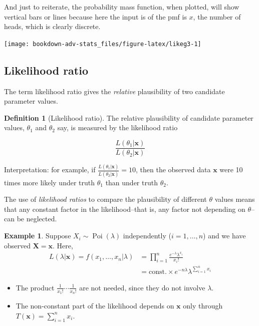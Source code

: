 \documentclass[
]{book}
\providecommand{\tightlist}{%
  \setlength{\itemsep}{0pt}\setlength{\parskip}{0pt}}
\newcommand{\bx}{{\boldsymbol x}}
\newcommand{\bX}{{\boldsymbol X}}
\DeclareMathOperator{\Pois}{Poi}
\newcommand{\const}{\text{const.}}
\theoremstyle{definition}
\newtheorem{definition}{Definition}[chapter]
\theoremstyle{definition}
\newtheorem{example}{Example}[chapter]
\theoremstyle{definition}
\theoremstyle{definition}
\theoremstyle{remark}
\begin{document}
And just to reiterate, the probability mass function, when plotted, will show vertical bars or lines because here the input is of the pmf is \(x\), the number of heads, which is clearly discrete.

\begin{center}\texttt{[image: bookdown-adv-stats\_files/figure-latex/likeg3-1]} \end{center}

\hypertarget{likelihood-ratio}{%
\subsection{Likelihood ratio}\label{likelihood-ratio}}

The term likelihood ratio gives the \emph{relative} plausibility of two candidate parameter values.

\begin{definition}[Likelihood ratio]
The relative plausibility of candidate parameter values, \(\theta_1\) and \(\theta_2\) say, is measured by the likelihood ratio

\[
\frac{L(\theta_1|\bx)}{L(\theta_2|\bx)}
\]
\end{definition}

Interpretation: for example, if \(\frac{L(\theta_1|\bx)}{L(\theta_2|\bx)} = 10\), then the observed data \(\bx\) were 10 times more likely under truth \(\theta_1\) than under truth \(\theta_2\).

The use of \emph{likelihood ratios} to compare the plausibility of different \(\theta\) values means that any constant factor in the likelihood--that is, any factor not depending on \(\theta\)--can be neglected.

\begin{example}

Suppose \(X_i\sim\Pois(\lambda)\) independently (\(i=1,\dots,n\)) and we have observed \(\bX=\bx\).
Here,
\begin{align*}
L(\lambda|\bx) = f(x_1,\dots,x_n|\lambda)
&= \prod_{i=1}^n \frac{e^{-\lambda}\lambda^{x_i}}{x_i!} \\
&= \const \times e^{-n\lambda}\lambda^{\sum_{i=1}^n x_i}
\end{align*}

\begin{itemize}
\tightlist
\item
  The product \(\frac{1}{x_1!}\cdots \frac{1}{x_n!}\) are not needed, since they do not involve \(\lambda\).
\item
  The non-constant part of the likelihood depends on \(\bx\) only through \(T(\bx)=\sum_{i=1}^n x_i\).
\end{itemize}

\end{example}
\end{document}
